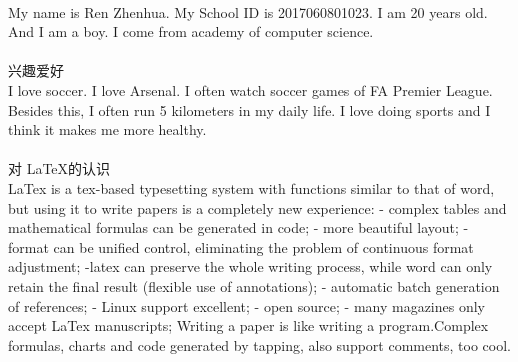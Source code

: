 \documentclass{article}
\begin{document}
\begin{CJK}{UTF8}{gkai}
\\
My name is Ren Zhenhua. My School ID is 2017060801023. I am 20 years old. And I am a boy. I come from academy of computer science.\\
\\
兴趣爱好\\
I love soccer. I love Arsenal. I often watch soccer games of FA Premier League. Besides this, I often run 5 kilometers in my daily life. I love doing sports and I think it makes me more healthy.\\
\\
对 \LaTeX 的认识\\
LaTex is a tex-based typesetting system with functions similar to that of word, but using it to write papers is a completely new experience:
- complex tables and mathematical formulas can be generated in code;
- more beautiful layout;
- format can be unified control, eliminating the problem of continuous format adjustment;
-latex can preserve the whole writing process, while word can only retain the final result (flexible use of annotations);
- automatic batch generation of references;
- Linux support excellent;
- open source;
- many magazines only accept LaTex manuscripts;
Writing a paper is like writing a program.Complex formulas, charts and code generated by tapping, also support comments, too cool.
\end{CJK}
\end{document}
